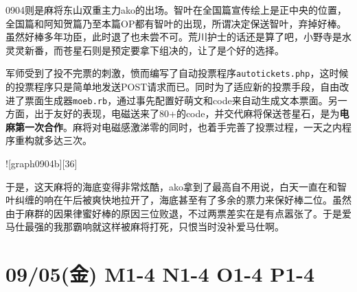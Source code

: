 
0904则是麻将东山双重主力ako的出场。智叶在全国篇宣传绘上是正中央的位置，全国篇和阿知贺篇乃至本篇OP都有智叶的出现，所谓决定保送智叶，弃掉好棒。虽然好棒多年功臣，此时退了也未尝不可。荒川护士的话还是算了吧，小野寺是水灵灵新番，而苍星石则是预定要拿下组决的，让了是个好的选择。

军师受到了投不完票的刺激，愤而编写了自动投票程序\verb`autotickets.php`，这时候的投票程序只是简单地发送POST请求而已。同时为了适应新的投票手段，自由改进了票面生成器\verb`moeb.rb`，通过事先配置好萌文和code来自动生成文本票面。另一方面，出于友好的表现，电磁送来了80+的code，并交代麻将保送苍星石，是为\textbf{电麻第一次合作}。麻将对电磁感激涕零的同时，也着手完善了投票过程，一天之内程序重构就多达三次。

![graph0904b][36]

于是，这天麻将的海底变得非常炫酷，ako拿到了最高自不用说，白天一直在和智叶纠缠的响在午后被爽快地拉开了，海底甚至有了多余的票力来保好棒二位。虽然由于麻群的因果律蜜好棒的原因三位败退，不过两票差实在是有点嚣张了。于是爱马仕最强的我那霸响就这样被麻将打死，只恨当时没补爱马仕啊。

\section{09/05(金) M1-4 N1-4 O1-4 P1-4}

